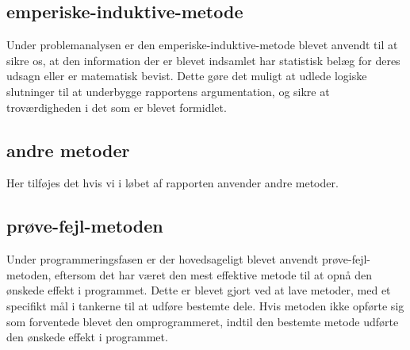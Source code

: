 \subsection{emperiske-induktive-metode}
Under problemanalysen er den emperiske-induktive-metode blevet anvendt til at sikre os, at den information der er blevet indsamlet har statistisk belæg for deres udsagn eller er matematisk bevist. Dette gøre det muligt at udlede logiske slutninger til at underbygge rapportens argumentation, og sikre at troværdigheden i det som er blevet formidlet.

\subsection{andre metoder}
Her tilføjes det hvis vi i løbet af rapporten anvender andre metoder.

\subsection{prøve-fejl-metoden}
Under programmeringsfasen er der hovedsageligt blevet anvendt prøve-fejl-metoden, eftersom det har været den mest effektive metode til at opnå den ønskede effekt i programmet. Dette er blevet gjort ved at lave metoder, med et specifikt mål i tankerne til at udføre bestemte dele. Hvis metoden ikke opførte sig som forventede blevet den omprogrammeret, indtil den bestemte metode udførte den ønskede effekt i programmet.

